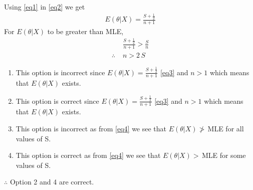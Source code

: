 \documentclass[journal,12pt,twocolumn]{IEEEtran}
\begin{document}
Using \eqref{eq1} in \eqref{eq2} we get
\begin{align}
    E(\theta|X) = \frac{S+\frac{1}{2}}{n+1}\label{eq3}
\end{align}
For $E(\theta|X)$ to be greater than MLE,
\begin{align}
    &\frac{S+\frac{1}{2}}{n+1} > \frac{S}{n}\nonumber\\
     \therefore\;&n>2\,S\label{eq4}
\end{align}
\begin{enumerate}
    \item This option is incorrect since $E(\theta|X) = \frac{S+\frac{1}{2}}{n+1}$ \eqref{eq3} and $n>1$ which means that $E(\theta|X)$ exists.
    \item This option is correct since $E(\theta|X) = \frac{S+\frac{1}{2}}{n+1}$ \eqref{eq3} and $n>1$ which means that $E(\theta|X)$ exists.
    \item This option is incorrect as from \eqref{eq4} we see that $E(\theta|X)\ngtr\, $MLE for all values of S.
    \item This option is correct as from \eqref{eq4} we see that $E(\theta|X)>\, $MLE for some values of S.
\end{enumerate}
$\therefore$ Option 2 and 4 are correct.\\
\end{document}
